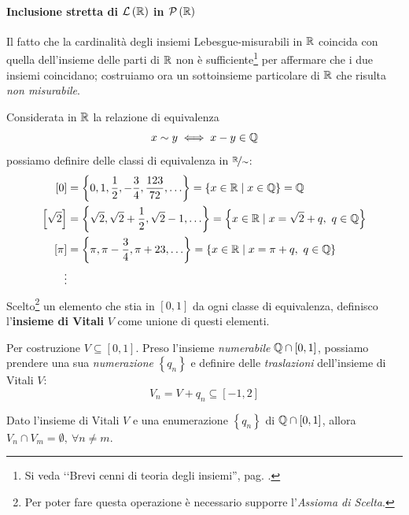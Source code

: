 \paragraph{Inclusione stretta di {$\mathcal{L}\left(\mathbb{R}\right)$} in {$\mathcal{P}\left(\mathbb{R}\right)$}}
Il fatto che la cardinalità degli insiemi Lebesgue-misurabili in $\mathbb{R}$ coincida con quella dell'insieme delle parti di $\mathbb{R}$ non è sufficiente\footnote{Si veda ‘‘Brevi cenni di teoria degli insiemi'', pag. \pageref{cardinalitàugualenonimplicauguaglianzainsiemistica}.} per affermare che i due insiemi coincidano; costruiamo ora un sottoinsieme particolare di $\mathbb{R}$ che risulta \textit{non misurabile}.
\begin{define}\label{vitali}
	Considerata in $\mathbb{R}$ la relazione di equivalenza
	\begin{equation}
		x\sim y\iff x-y\in\mathbb{Q}
	\end{equation}
	possiamo definire delle classi di equivalenza in $\nicefrac{\mathbb{R}}{\sim}$:
	\begin{align*}
		\left[0\right]&=\left\{0,1,\frac{1}{2},-\frac{3}{4},\frac{123}{72},\ldots\right\}=\left\{x\in\mathbb{R}\mid x\in\mathbb{Q}\right\}=\mathbb{Q}\\
		\left[\sqrt{2}\right]&=\left\{\sqrt{2},\sqrt{2}+\frac{1}{2},\sqrt{2}-1,\ldots\right\}=\left\{x\in\mathbb{R}\mid x=\sqrt{2}+q,\ q\in\mathbb{Q}\right\}\\
		\left[\pi\right]&=\left\{\pi,\pi-\frac{3}{4},\pi+23,\ldots\right\}=\left\{x\in\mathbb{R}\mid x=\pi+q,\ q\in\mathbb{Q}\right\}\\
		\vdots
	\end{align*}
	Scelto\footnote{Per poter fare questa operazione è necessario supporre l'\textit{Assioma di Scelta}.} un elemento che stia in $\left[0,1\right]$ da ogni classe di equivalenza, definisco l'\textbf{insieme di Vitali} $V$ come unione di questi elementi.
\end{define}
Per costruzione $V\subseteq\left[0,1\right]$. Preso l'insieme \textit{numerabile} $\mathbb{Q}\cap\left[0,1\right]$, possiamo prendere una sua \textit{numerazione} $\left\{q_n\right\}$ e definire delle \textit{traslazioni} dell'insieme di Vitali $V$:
\begin{equation*}
	V_n=V+q_n\subseteq\left[-1,2\right]
\end{equation*}
\begin{lemming}
	Dato l'insieme di Vitali $V$  e una enumerazione $\left\{q_n\right\}$  di $\mathbb{Q}\cap\left[0,1\right]$, allora $V_n\cap V_m=\emptyset,\ \forall n\neq m$.
\end{lemming}
